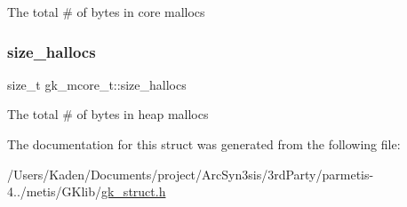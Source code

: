 The total \# of bytes in core mallocs \mbox{\label{a00682_a4c180c60538546b4ab67bb91264e1c6e}} 
\subsubsection{\texorpdfstring{size\+\_\+hallocs}{size\_hallocs}}
{\footnotesize\ttfamily size\+\_\+t gk\+\_\+mcore\+\_\+t\+::size\+\_\+hallocs}

The total \# of bytes in heap mallocs 

The documentation for this struct was generated from the following file\+:\begin{DoxyCompactItemize}
\item 
/\+Users/\+Kaden/\+Documents/project/\+Arc\+Syn3sis/3rd\+Party/parmetis-\/4../metis/\+G\+Klib/\hyperlink{a00080}{gk\+\_\+struct.\+h}\end{DoxyCompactItemize}
